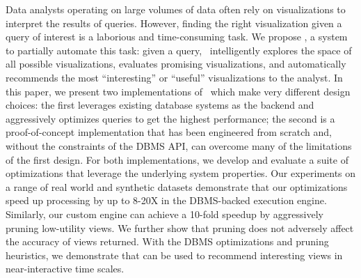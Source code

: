 

Data analysts operating on large volumes of data often rely on visualizations to
interpret the results of queries.
However, finding the right visualization given a query of interest is a
laborious and time-consuming task.
We propose \VizRecDB, a system to partially automate this task:
given a query, \VizRecDB\ intelligently explores the space of all possible
visualizations, evaluates promising visualizations, and automatically recommends
the most ``interesting'' or ``useful'' visualizations to the analyst.
In this paper, we present two implementations of \VizRecDB\ which make very
different design choices: the first leverages existing database systems as the
backend and aggressively optimizes queries to get the highest performance; the
second is a proof-of-concept implementation that has been engineered from
scratch and, without the constraints of the DBMS API, can overcome many of the
limitations of the first design.
For both implementations, we develop and evaluate a suite of optimizations that
leverage the underlying system properties.
Our experiments on a range of real world and synthetic datasets demonstrate
that our optimizations speed up processing by up to 8-20X in the DBMS-backed
execution engine.
Similarly, our custom engine can achieve a 10-fold speedup by aggressively
pruning low-utility views. We further show that pruning does not adversely
affect the accuracy of views returned.
With the DBMS optimizations and pruning heuristics, we demonstrate that
\VizRecDB can be used to recommend interesting views in near-interactive time
scales.
